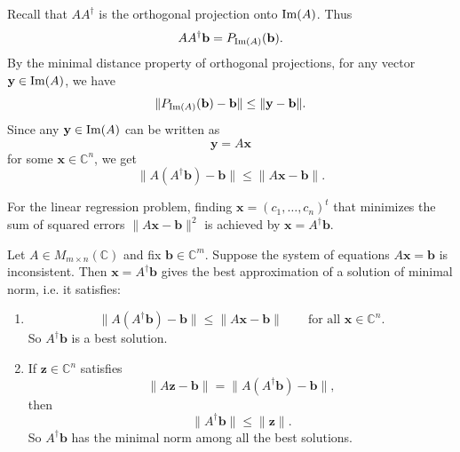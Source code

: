 \begin{pfbox}
Recall that $AA^\dagger$ is the orthogonal projection onto $\operatorname{Im}(A)$.
Thus
\[
AA^\dagger\mathbf{b}
=
P_{\operatorname{Im}(A)}(\mathbf{b}).
\]
By the minimal distance property of orthogonal projections, for any vector
$\mathbf{y}\in \operatorname{Im}(A)$, we have
\[
\|P_{\operatorname{Im}(A)}(\mathbf{b})-\mathbf{b}\|
\le
\|\mathbf{y}-\mathbf{b}\|.
\]
Since any $\mathbf{y}\in \operatorname{Im}(A)$ can be written as
\[
\mathbf{y}=A\mathbf{x}
\]
for some $\mathbf{x}\in \mathbb{C}^n$, we get
\[
\|A(A^\dagger\mathbf{b})-\mathbf{b}\|
\le
\|A\mathbf{x}-\mathbf{b}\|.
\]
\end{pfbox}

\begin{corollary}
For the linear regression problem, finding
$\mathbf{x}=(c_1,\dots,c_n)^t$ that minimizes the sum of squared errors
$\|A\mathbf{x}-\mathbf{b}\|^2$
is achieved by $\mathbf{x}=A^\dagger\mathbf{b}$.
\end{corollary}

\begin{theorem}
Let $A\in M_{m\times n}(\mathbb{C})$ and fix $\mathbf{b}\in\mathbb{C}^m$.
Suppose the system of equations $A\mathbf{x}=\mathbf{b}$ is inconsistent. Then
$\mathbf{x}=A^\dagger \mathbf{b}$ gives the best approximation of a solution of minimal norm, i.e. it satisfies:
\begin{enumerate}
    \item
    \[
    \|A(A^\dagger\mathbf{b})-\mathbf{b}\|
    \le
    \|A\mathbf{x}-\mathbf{b}\|
    \qquad
    \text{for all } \mathbf{x}\in\mathbb{C}^n.
    \]
    So $A^\dagger\mathbf{b}$ is a best solution.

    \item
    If $\mathbf{z}\in\mathbb{C}^n$ satisfies
    \[
    \|A\mathbf{z}-\mathbf{b}\|
    =
    \|A(A^\dagger\mathbf{b})-\mathbf{b}\|,
    \]
    then
    \[
    \|A^\dagger\mathbf{b}\|\le \|\mathbf{z}\|.
    \]
    So $A^\dagger\mathbf{b}$ has the minimal norm among all the best solutions.
\end{enumerate}
\end{theorem}

